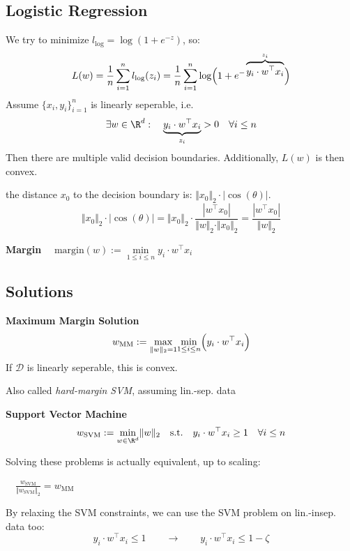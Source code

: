 \newpage
\subsection{Logistic Regression}

We try to minimize $l_\text{log} = \log(1+e^{-z})$, so:
$$
    L(w) = \frac{1}{n}\sum_{i=1}^{n} l_\text{log}(z_i) = \frac{1}{n}\sum_{i=1}^{n}\log\Bigl( 1 + e^{-\overbrace{y_i \cdot w^\top x_i}^{z_i}} \Bigr)
$$
Assume $\{x_i,y_i\}_{i=1}^n$ is linearly seperable, i.e. 
$$
    \exists w \in \R^d:\quad \underbrace{y_i \cdot w^\top x_i}_{z_i} > 0 \quad \forall i \leq n
$$
Then there are multiple valid decision boundaries. Additionally, $L(w)$ is then convex.

the distance $x_0$ to the decision boundary is: $\Vert x_0 \Vert_2 \cdot |\cos(\theta)|$.\\
$$
    \Vert x_0 \Vert_2 \cdot |\cos(\theta)| = \Vert x_0 \Vert_2 \cdot \frac{|w^\top x_0 |}{\Vert w \Vert_2 \cdot \Vert x_0 \Vert_2} = \frac{|w^\top x_0|}{\Vert w \Vert_2}
$$

 \textbf{Margin} $\quad \text{margin}(w) := \underset{1\leq i\leq n}{\min} y_i \cdot w^\top x_i$

\subsection{Solutions}

 \textbf{Maximum Margin Solution}
$$
    w_\text{MM} := \underset{\Vert w \Vert_2=1}{\max} \underset{1\leq i\leq n}{\min} \Bigl( y_i \cdot w^\top x_i \Bigr)
$$
If $\mathcal{D}$ is linearly seperable, this is convex.

{\scriptsize
    \remark Also called \textit{hard-margin SVM}, assuming lin.-sep. data
}

 \textbf{Support Vector Machine}
$$
    w_\text{SVM} := \underset{w \in \R^d}{\min} \Vert w \Vert_2 \quad\text{s.t.}\quad y_i \cdot w^\top x_i \geq 1 \quad \forall i \leq n
$$

Solving these problems is actually equivalent, up to scaling:

\lemma $\quad\displaystyle\frac{w_\text{SVM}}{\Vert w_\text{SVM} \Vert_2} = w_\text{MM}$

\newpage

By relaxing the SVM constraints, we can use the SVM problem on lin.-insep. data too:
$$
    y_i \cdot w^\top x_i \leq 1 \qquad \to \qquad y_i \cdot w^\top x_i \leq 1 - \zeta
$$

